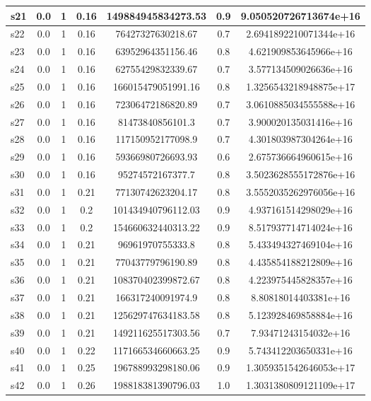 \documentclass{article}
\begin{document}
\begin{tabular}{|l|c|c|c|c|c|c|}
\hline
s21 &0.0 & 1 & 0.16 & 149884945834273.53 & 0.9 & 9.050520726713674e+16\\
\hline
s22 &0.0 & 1 & 0.16 & 76427327630218.67 & 0.7 & 2.6941892210071344e+16\\
\hline
s23 &0.0 & 1 & 0.16 & 63952964351156.46 & 0.8 & 4.621909853645966e+16\\
\hline
s24 &0.0 & 1 & 0.16 & 62755429832339.67 & 0.7 & 3.577134509026636e+16\\
\hline
s25 &0.0 & 1 & 0.16 & 166015479051991.16 & 0.8 & 1.3256543218948875e+17\\
\hline
s26 &0.0 & 1 & 0.16 & 72306472186820.89 & 0.7 & 3.0610885034555588e+16\\
\hline
s27 &0.0 & 1 & 0.16 & 81473840856101.3 & 0.7 & 3.900020135031416e+16\\
\hline
s28 &0.0 & 1 & 0.16 & 117150952177098.9 & 0.7 & 4.301803987304264e+16\\
\hline
s29 &0.0 & 1 & 0.16 & 59366980726693.93 & 0.6 & 2.675736664960615e+16\\
\hline
s30 &0.0 & 1 & 0.16 & 95274572167377.7 & 0.8 & 3.5023628555172876e+16\\
\hline
s31 &0.0 & 1 & 0.21 & 77130742623204.17 & 0.8 & 3.5552035262976056e+16\\
\hline
s32 &0.0 & 1 & 0.2 & 101434940796112.03 & 0.9 & 4.937161514298029e+16\\
\hline
s33 &0.0 & 1 & 0.2 & 154660632440313.22 & 0.9 & 8.517937714714024e+16\\
\hline
s34 &0.0 & 1 & 0.21 & 96961970755333.8 & 0.8 & 5.433494327469104e+16\\
\hline
s35 &0.0 & 1 & 0.21 & 77043779796190.89 & 0.8 & 4.435854188212809e+16\\
\hline
s36 &0.0 & 1 & 0.21 & 108370402399872.67 & 0.8 & 4.223975445828357e+16\\
\hline
s37 &0.0 & 1 & 0.21 & 166317240091974.9 & 0.8 & 8.80818014403381e+16\\
\hline
s38 &0.0 & 1 & 0.21 & 125629747634183.58 & 0.8 & 5.123928469858884e+16\\
\hline
s39 &0.0 & 1 & 0.21 & 149211625517303.56 & 0.7 & 7.93471243154032e+16\\
\hline
s40 &0.0 & 1 & 0.22 & 117166534660663.25 & 0.9 & 5.743412203650331e+16\\
\hline
s41 &0.0 & 1 & 0.25 & 196788993298180.06 & 0.9 & 1.3059351542646053e+17\\
\hline
s42 &0.0 & 1 & 0.26 & 198818381390796.03 & 1.0 & 1.3031380809121109e+17\\

\end{tabular}
\end{document}
